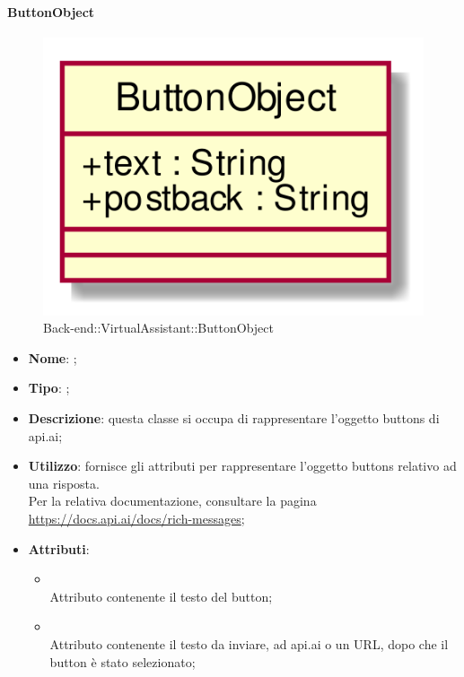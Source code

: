 \hypertarget{ButtonObject_label}{\paragraph{ButtonObject}}
\begin{figure}[h]
	\centering
	\includegraphics[width=\textwidth,height=\textheight,keepaspectratio]{images/ClassButtonObject.png}
	\caption{Back-end::VirtualAssistant::ButtonObject}
\end{figure}
\begin{itemize}
	\item \textbf{Nome}: ;
	\item \textbf{Tipo}: ;
	\item \textbf{Descrizione}: questa classe si occupa di rappresentare l'oggetto buttons di api.ai;
	\item \textbf{Utilizzo}: fornisce gli attributi per rappresentare l'oggetto buttons relativo ad una risposta. \\
Per la relativa documentazione, consultare la pagina \url{https://docs.api.ai/docs/rich-messages};
	\item \textbf{Attributi}:
	\begin{itemize}
		\item[]  \\
		Attributo contenente il testo del button;
		\item[]  \\
		Attributo contenente il testo da inviare, ad api.ai o un URL, dopo che il button è stato selezionato;
	\end{itemize}
\end{itemize}

